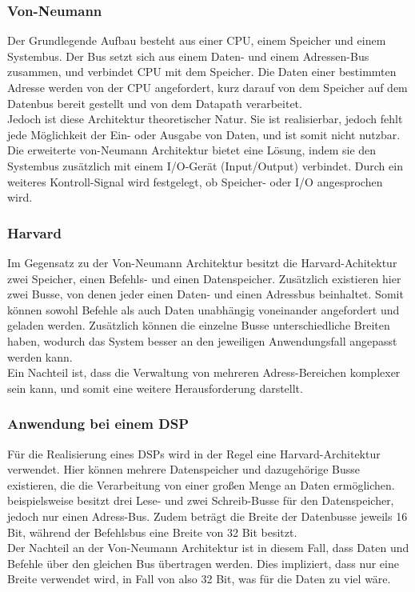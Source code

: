 \subsubsection{Von-Neumann}
Der Grundlegende Aufbau besteht aus einer CPU, einem Speicher und einem Systembus. 
Der Bus setzt sich aus einem Daten- und einem Adressen-Bus zusammen, und verbindet CPU mit dem Speicher. Die Daten einer bestimmten Adresse werden von der CPU angefordert, kurz darauf von dem Speicher auf dem Datenbus bereit gestellt und von dem Datapath verarbeitet.\\
Jedoch ist diese Architektur theoretischer Natur. Sie ist realisierbar, jedoch fehlt jede Möglichkeit der Ein- oder Ausgabe von Daten, und ist somit nicht nutzbar.\\
Die erweiterte von-Neumann Architektur bietet eine Lösung, indem sie den Systembus zusätzlich mit einem I/O-Gerät (Input/Output) verbindet. Durch ein weiteres Kontroll-Signal wird festgelegt, ob Speicher- oder I/O angesprochen wird. 

\subsubsection{Harvard}
Im Gegensatz zu der Von-Neumann Architektur besitzt die Harvard-Achitektur zwei Speicher, einen Befehls- und einen Datenspeicher. Zusätzlich existieren hier zwei Busse, von denen jeder einen Daten- und einen Adressbus beinhaltet. Somit können sowohl Befehle als auch Daten unabhängig voneinander angefordert und geladen werden. Zusätzlich können die einzelne Busse unterschiedliche Breiten haben, wodurch das System besser an den jeweiligen Anwendungsfall angepasst werden kann.\\
Ein Nachteil ist, dass die Verwaltung von mehreren Adress-Bereichen komplexer sein kann, und somit eine weitere Herausforderung darstellt.

\subsubsection{Anwendung bei einem DSP}
Für die Realisierung eines DSPs wird in der Regel eine Harvard-Architektur verwendet. Hier können mehrere Datenspeicher und dazugehörige Busse existieren, die die Verarbeitung von einer großen Menge an Daten ermöglichen. \cite{TI_c55x} beispielsweise besitzt drei Lese- und zwei Schreib-Busse für den Datenspeicher, jedoch nur einen Adress-Bus. Zudem beträgt die Breite der Datenbusse jeweils 16 Bit, während der Befehlsbus eine Breite von 32 Bit besitzt.\\
Der Nachteil an der Von-Neumann Architektur ist in diesem Fall, dass Daten und Befehle über den gleichen Bus übertragen werden.  Dies impliziert, dass nur eine Breite verwendet wird, in Fall von \cite{TI_c55x} also 32 Bit, was für die Daten zu viel wäre.

